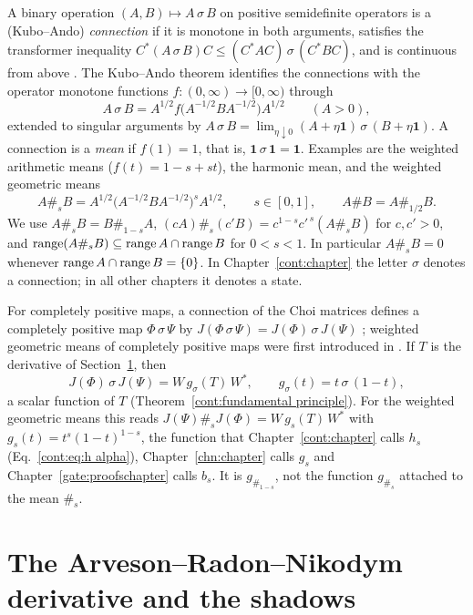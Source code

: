 A binary operation $(A,B)\mapsto A\,\sigma\,B$ on positive semidefinite operators is a (Kubo--Ando) \emph{connection} if it is monotone in both arguments, satisfies the transformer inequality $C^*(A\,\sigma\,B)C\le(C^*AC)\,\sigma\,(C^*BC)$, and is continuous from above \cite{KuboAndo1980}. The Kubo--Ando theorem identifies the connections with the operator monotone functions $f:(0,\infty)\to[0,\infty)$ through
\[
A\,\sigma\,B=A^{1/2}f\big(A^{-1/2}BA^{-1/2}\big)A^{1/2}\qquad(A>0),
\]
extended to singular arguments by $A\,\sigma\,B=\lim_{\eta\downarrow0}(A+\eta\mathbf 1)\,\sigma\,(B+\eta\mathbf 1)$. A connection is a \emph{mean} if $f(1)=1$, that is, $\mathbf 1\,\sigma\,\mathbf 1=\mathbf 1$. Examples are the weighted arithmetic means ($f(t)=1-s+st$), the harmonic mean, and the weighted geometric means
\[
A\#_sB=A^{1/2}\big(A^{-1/2}BA^{-1/2}\big)^sA^{1/2},\qquad s\in[0,1],\qquad A\#B=A\#_{1/2}B .
\]
We use $A\#_sB=B\#_{1-s}A$, $(cA)\#_s(c'B)=c^{1-s}c'^{\,s}(A\#_sB)$ for $c,c'>0$, and $\operatorname{range}(A\#_sB)\subseteq\operatorname{range} A\cap\operatorname{range} B$ for $0<s<1$. In particular $A\#_sB=0$ whenever $\operatorname{range} A\cap\operatorname{range} B=\{0\}$. In Chapter~\ref{cont:chapter} the letter $\sigma$ denotes a connection; in all other chapters it denotes a state.

For completely positive maps, a connection of the Choi matrices defines a completely positive map $\Phi\,\sigma\,\Psi$ by $J(\Phi\,\sigma\,\Psi)=J(\Phi)\,\sigma\,J(\Psi)$ \cite{kian2026relative}; weighted geometric means of completely positive maps were first introduced in \cite{FMVW2025}. If $T$ is the derivative of Section~\ref{nt:sec:arn}, then
\[
J(\Phi)\,\sigma\,J(\Psi)=W\,g_\sigma(T)\,W^*,\qquad g_\sigma(t)=t\,\sigma\,(1-t),
\]
a scalar function of $T$ (Theorem~\ref{cont:fundamental principle}). For the weighted geometric means this reads $J(\Psi)\#_sJ(\Phi)=W\,g_s(T)\,W^*$ with $g_s(t)=t^s(1-t)^{1-s}$, the function that Chapter~\ref{cont:chapter} calls $h_s$ (Eq.~\eqref{cont:eq:h alpha}), Chapter~\ref{chn:chapter} calls $g_s$ and Chapter~\ref{gate:proofschapter} calls $b_s$. It is $g_{\#_{1-s}}$, not the function $g_{\#_s}$ attached to the mean $\#_s$.

\section{The Arveson--Radon--Nikodym derivative and the shadows}\label{nt:sec:arn}

